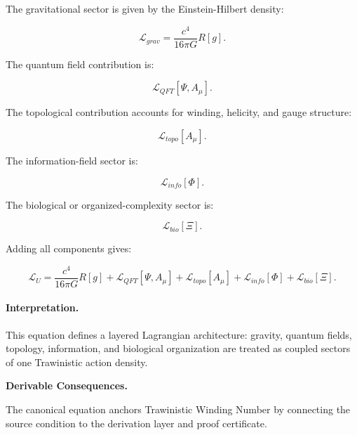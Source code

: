 The gravitational sector is given by the Einstein-Hilbert density:

\begin{equation}
\mathcal{L}_{grav}
=
\frac{c^4}{16\pi G}R[g].
\end{equation}

The quantum field contribution is:

\begin{equation}
\mathcal{L}_{QFT}[\Psi,A_\mu].
\end{equation}

The topological contribution accounts for winding, helicity, and gauge structure:

\begin{equation}
\mathcal{L}_{topo}[A_\mu].
\end{equation}

The information-field sector is:

\begin{equation}
\mathcal{L}_{info}[\Phi].
\end{equation}

The biological or organized-complexity sector is:

\begin{equation}
\mathcal{L}_{bio}[\Xi].
\end{equation}

Adding all components gives:

\begin{equation}
\boxed{
\mathcal{L}_U
=
\frac{c^4}{16\pi G}R[g]
+
\mathcal{L}_{QFT}[\Psi,A_\mu]
+
\mathcal{L}_{topo}[A_\mu]
+
\mathcal{L}_{info}[\Phi]
+
\mathcal{L}_{bio}[\Xi].
}
\end{equation}

\paragraph{Interpretation.}
This equation defines a layered Lagrangian architecture: gravity, quantum fields, topology, information, and biological organization are treated as coupled sectors of one Trawinistic action density.

\par\vspace{0.35em}
\noindent\textbf{Derivable Consequences.}\quad
\begingroup
\footnotesize
\raggedright
The canonical equation anchors Trawinistic Winding Number by connecting the source condition to the derivation layer and proof certificate.
\par\endgroup

